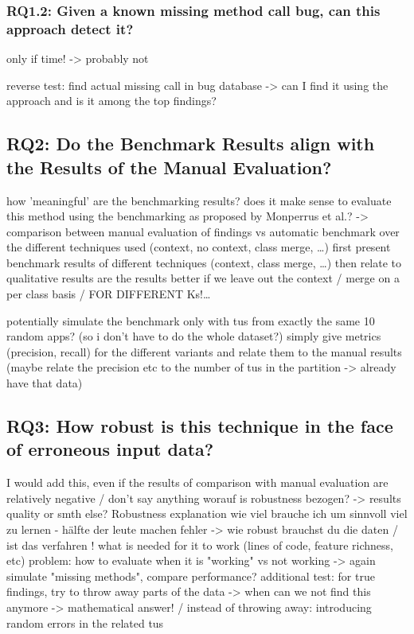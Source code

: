\subsubsection{RQ1.2: Given a known missing method call bug, can this approach detect it?}
only if time! -> probably not

reverse test: find actual missing call in bug database -> can I find it using the approach and is it among the top findings?

\subsection{RQ2: Do the Benchmark Results align with the Results of the Manual Evaluation?}

how 'meaningful' are the benchmarking results?
does it make sense to evaluate this method using the benchmarking as proposed by Monperrus et al.?
-> comparison between manual evaluation of findings vs automatic benchmark over the different techniques used (context, no context, class merge, \ldots)
first present benchmark results of different techniques (context, class merge, \ldots) then relate to qualitative results
are the results better if we leave out the context / merge on a per class basis / FOR DIFFERENT Ks!\ldots


potentially simulate the benchmark only with tus from exactly the same 10 random apps? (so i don't have to do the whole dataset?)
simply give metrics (precision, recall) for the different variants and relate them to the manual results
(maybe relate the precision etc to the number of tus in the partition -> already have that data)

\subsection{RQ3: How robust is this technique in the face of erroneous input data?}

I would add this, even if the results of comparison with manual evaluation are relatively negative / don't say anything
worauf is robustness bezogen? -> results quality or smth else?
Robustness explanation
    wie viel brauche ich um sinnvoll viel zu lernen - hälfte der leute machen fehler -> wie robust brauchst du die daten / ist das verfahren !
    what is needed for it to work (lines of code, feature richness, etc) 
    problem: how to evaluate when it is "working" vs not working -> again simulate "missing methods", compare performance?
additional test:
	for true findings, try to throw away parts of the data -> when can we not find this anymore -> mathematical answer!
    / instead of throwing away: introducing random errors in the related tus

